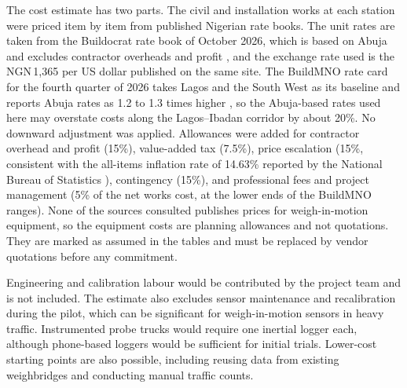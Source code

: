 \documentclass[11pt,a4paper]{article}
\renewcommand{\arraystretch}{1.35}
\begin{document}
The cost estimate has two parts. The civil and installation works at each station were priced item by item from published Nigerian rate books. The unit rates are taken from the Buildocrat rate book of October 2026, which is based on Abuja and excludes contractor overheads and profit \cite{buildocrat}, and the exchange rate used is the \mbox{NGN\,1,365} per US dollar published on the same site. The BuildMNO rate card for the fourth quarter of 2026 takes Lagos and the South West as its baseline and reports Abuja rates as 1.2 to 1.3 times higher \cite{buildmno}, so the Abuja-based rates used here may overstate costs along the Lagos--Ibadan corridor by about 20\%. No downward adjustment was applied. Allowances were added for contractor overhead and profit (15\%), value-added tax (7.5\%), price escalation (15\%, consistent with the all-items inflation rate of 14.63\% reported by the National Bureau of Statistics \cite{nbs}), contingency (15\%), and professional fees and project management (5\% of the net works cost, at the lower ends of the BuildMNO ranges). None of the sources consulted publishes prices for weigh-in-motion equipment, so the equipment costs are planning allowances and not quotations. They are marked as assumed in the tables and must be replaced by vendor quotations before any commitment.

\renewcommand{\arraystretch}{1.3}
\begin{table}[h]
\centering\scriptsize

\caption{Civil and installation works for one station. Codes refer to items in the Buildocrat rate book \cite{buildocrat}; quantities are our estimates for a dual three-lane carriageway.}
\end{table}
\begin{table}[h]
\centering\small

\caption{Estimated budget for the three-station pilot. The total is dominated by the equipment allowance, which is the least certain item, so we regard it as accurate to about $\pm$40\%.}
\end{table}
\renewcommand{\arraystretch}{1.35}

Engineering and calibration labour would be contributed by the project team and is not included. The estimate also excludes sensor maintenance and recalibration during the pilot, which can be significant for weigh-in-motion sensors in heavy traffic. Instrumented probe trucks would require one inertial logger each, although phone-based loggers would be sufficient for initial trials. Lower-cost starting points are also possible, including reusing data from existing weighbridges and conducting manual traffic counts.
\end{document}

